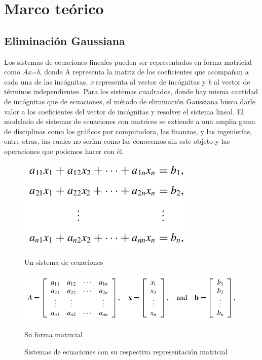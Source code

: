 \section{Marco teórico}

\subsection{Eliminación Gaussiana}

Los sistemas de ecuaciones lineales pueden ser representados en forma matricial como \textit{Ax=b}, donde A representa la matriz de los coeficientes que acompañan a cada una de las incógnitas, \textit{x} representa al vector de incógnitas y \textit{b} al vector de términos independientes. Para los sistemas cuadrados, donde hay misma cantidad de incógnitas que de ecuaciones, el método de eliminación Gaussiana busca darle valor a los coeficientes del vector de incógnitas y resolver el sistema lineal. El modelado de sistemas de ecuaciones con matrices se extiende a una amplia gama de disciplinas como los gráficos por computadora, las finanzas, y las ingenierías, entre otras, las cuales no serían como las conocemos sin este objeto y las operaciones que podemos hacer con él. 

\begin{figure}[h]
    \centering
    \begin{minipage}{0.3\linewidth}
        \includegraphics[width=\linewidth]{img/sistema_de_ecuaciones.png}
        \caption{Un sistema de ecuaciones}
    \end{minipage}
  \begin{minipage}{0.45\linewidth}
      \includegraphics[width=\linewidth]{img/combinacion_lineal.png}
      \caption{Su forma matricial}
  \end{minipage}
  \caption{Sistemas de ecuaciones con su respectiva representación matricial}
\end{figure}


